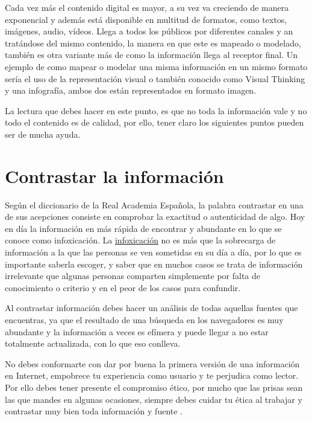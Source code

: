 \documentclass[
  a4paper,
  openany]{book}
\begin{document}
Cada vez más el contenido digital es mayor, a su vez va creciendo de manera exponencial y además está disponible en multitud de formatos, como textos, imágenes, audio, vídeos. Llega a todos los públicos por diferentes canales y an tratándose del mismo contenido, la manera en que este es mapeado o modelado, también es otra variante más de como la información llega al receptor final. Un ejemplo de como mapear o modelar una misma información en un mismo formato sería el uso de la representación visual o también conocido como Visual Thinking y una infografía, ambos dos están representados en formato imagen.

La lectura que debes hacer en este punto, es que no toda la información vale y no todo el contenido es de calidad, por ello, tener claro los siguientes puntos pueden ser de mucha ayuda.

\hypertarget{contrastar-la-informaciuxf3n}{%
\section{Contrastar la información}\label{contrastar-la-informaciuxf3n}}

Según el diccionario de la Real Academia Española, la palabra contrastar en una de sus acepciones consiste en comprobar la exactitud o autenticidad de algo. Hoy en día la información en más rápida de encontrar y abundante en lo que se conoce como infoxicación. La \href{https://es.godaddy.com/blog/infoxicacion-causas-consecuencias/}{infoxicación} no es más que la sobrecarga de información a la que las personas se ven sometidas en su día a día, por lo que es importante saberla escoger, y saber que en muchos casos se trata de información irrelevante que algunas personas comparten simplemente por falta de conocimiento o criterio y en el peor de los casos para confundir.

Al contrastar información debes hacer un análisis de todas aquellas fuentes que encuentras, ya que el resultado de una búsqueda en los navegadores es muy abundante y la información a veces es efímera y puede llegar a no estar totalmente actualizada, con lo que eso conlleva.

No debes conformarte con dar por buena la primera versión de una información en Internet, empobrece tu experiencia como usuario y te perjudica como lector. Por ello debes tener presente el compromiso ético, por mucho que las prisas sean las que mandes en algunas ocasiones, siempre debes cuidar tu ética al trabajar y contrastar muy bien toda información y fuente \citep{contrastar-informacion}.
\end{document}
